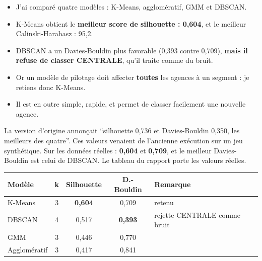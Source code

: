 \documentclass[a4paper,11pt]{article}
\begin{document}

\begin{itemize}[leftmargin=*,itemsep=1pt]
  \item J'ai comparé quatre modèles : K-Means, agglomératif, GMM et DBSCAN.
  \item K-Means obtient le \textbf{meilleur score de silhouette : 0,604}, et le meilleur Calinski-Harabasz : 95,2.
  \item DBSCAN a un Davies-Bouldin plus favorable (0,393 contre 0,709), \textbf{mais il refuse de classer CENTRALE}, qu'il traite comme du bruit.
  \item Or un modèle de pilotage doit affecter \textbf{toutes} les agences à un segment : je retiens donc K-Means.
  \item Il est en outre simple, rapide, et permet de classer facilement une nouvelle agence.
\end{itemize}

\begin{corrige}
La version d'origine annonçait \enquote{silhouette 0,736 et Davies-Bouldin
0,350, les meilleurs des quatre}. Ces valeurs venaient de l'ancienne exécution
sur un jeu synthétique. Sur les données réelles : \textbf{0,604} et
\textbf{0,709}, et le meilleur Davies-Bouldin est celui de DBSCAN. Le tableau
du rapport porte les valeurs réelles.
\end{corrige}

\noindent\begin{tabularx}{\textwidth}{|L{3.4cm}|c|c|c|X|}
\hline
{}
\textbf{Modèle} & \textbf{k} & \textbf{Silhouette} & \textbf{D.-Bouldin} & \textbf{Remarque}\\
\hline
K-Means & 3 & \textbf{0,604} & 0,709 & retenu\\
\hline
DBSCAN & 4 & 0,517 & \textbf{0,393} & rejette CENTRALE comme bruit\\
\hline
GMM & 3 & 0,446 & 0,770 & \\
\hline
Agglomératif & 3 & 0,417 & 0,841 & \\
\hline
\end{tabularx}

\end{document}
